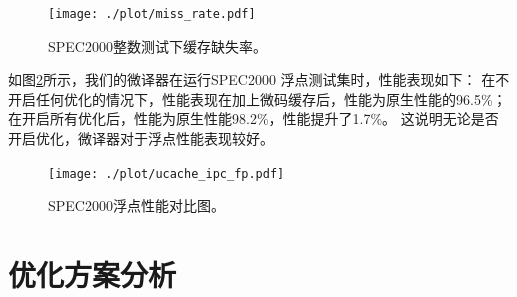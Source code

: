 \begin{figure}[!htbp]
  \centering
  \texttt{[image: ./plot/miss\_rate.pdf]}
  \caption{SPEC2000整数测试下缓存缺失率。}
  \label{img:miss_rate}
\end{figure}

如图\ref{img:ipc_fp}所示，我们的微译器在运行SPEC2000 浮点测试集时，性能表现如下：
在不开启任何优化的情况下，性能表现在加上微码缓存后，性能为原生性能的96.5\%；
在开启所有优化后，性能为原生性能98.2\%，性能提升了1.7\%。
这说明无论是否开启优化，微译器对于浮点性能表现较好。


\begin{figure}[!htbp]
  \centering
  \texttt{[image: ./plot/ucache\_ipc\_fp.pdf]}
  \caption{SPEC2000浮点性能对比图。}
  \label{img:ipc_fp}
\end{figure}


\section{优化方案分析}